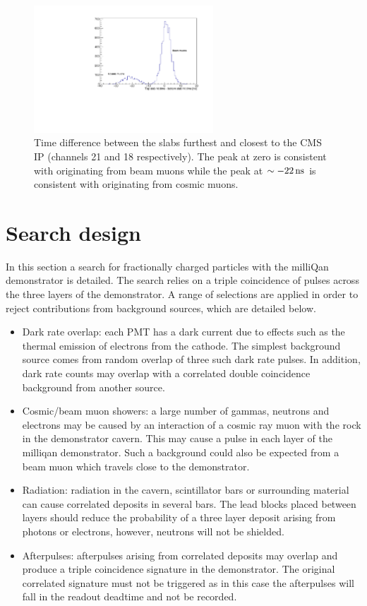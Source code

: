 \documentclass[12pt]{article}
\newcommand{\unit}[1]{\ensuremath{\text{\,#1}}\xspace}
\begin{document}
\begin{figure}[ht!]
    \centering
    \includegraphics[width=0.6\textwidth]{figures/timeDiffSlabs}
    \caption{\label{fig:timeDiff} Time difference between the slabs furthest and closest to the CMS IP (channels 21 and 18 respectively).
    The peak at zero is consistent with originating from beam muons while the peak at $\sim -22\unit{ns}$ is consistent with originating from 
    cosmic muons.}
\end{figure}

\section{Search design}
\label{sec:search}

In this section a search for fractionally charged particles with the milliQan demonstrator is
detailed. The search relies on a triple coincidence of pulses across the three layers of the demonstrator. 
A range of selections are applied in order to reject contributions from
background sources, which are detailed below.

\begin{itemize}
    \item Dark rate overlap: each PMT has a dark current due to effects such as the thermal emission of electrons from the cathode. The simplest background source comes from random overlap of three such dark rate pulses. In addition, dark rate counts may overlap with a correlated double coincidence background from another source.
    \item Cosmic/beam muon showers: a large number of gammas, neutrons and electrons may be caused by an interaction of a cosmic ray muon with the rock in the demonstrator cavern. This may cause a pulse in each layer of the milliqan demonstrator. Such a background could also be expected from a beam muon which travels close to the demonstrator.
    \item Radiation: radiation in the cavern, scintillator bars or surrounding material can cause correlated deposits in several bars. The lead blocks placed between layers should reduce the probability of a three layer deposit arising from photons or electrons, however, neutrons will not be shielded. 
    \item Afterpulses: afterpulses arising from correlated deposits may overlap and produce a triple coincidence signature in the demonstrator. The original correlated signature must not be triggered as in this case the afterpulses will fall in the readout deadtime and not be recorded.
\end{itemize}
\end{document}
